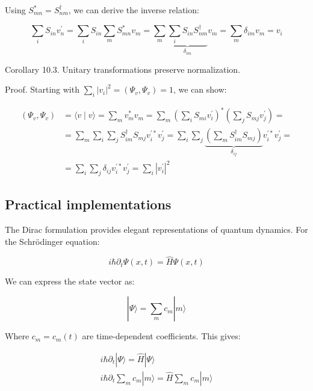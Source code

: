 \documentclass[italian]{HKNdocument}
\begin{document}
Using $S_{m n}^{*}=S_{n m}^{\dagger}$, we can derive the inverse relation:

\begin{equation}
\sum_{i} S_{i n} v_{n}^{\prime}=\sum_{i} S_{i n} \sum_{m} S_{m n}^{*} v_{m}=\sum_{m} \underbrace{\sum_{i} S_{i n} S_{n m}^{\dagger}}_{\delta_{i m}} v_{m}=\sum_{m} \delta_{i m} v_{m}=v_{i} \label{eq:10.18}
\end{equation}

Corollary 10.3. Unitary transformations preserve normalization.

Proof. Starting with $\sum_{i}\left|v_{i}\right|^{2}=\left(\Psi_{v}, \Psi_{v}\right)=1$, we can show:

\begin{align}
\left(\Psi_{v}, \Psi_{v}\right) & =\langle v \mid v\rangle=\sum_{m} v_{m}^{*} v_{m}=\sum_{m}\left(\sum_{i} S_{m i} v_{i}^{\prime}\right)^{*}\left(\sum_{j} S_{m j} v_{j}^{\prime}\right)= \\
& =\sum_{m} \sum_{i} \sum_{j} S_{i m}^{\dagger} S_{m j} v_{i}^{\prime*} v_{j}^{\prime}=\sum_{i} \sum_{j} \underbrace{\left(\sum_{m} S_{i m}^{\dagger} S_{m j}\right)}_{\delta_{i j}} v_{i}^{\prime*} v_{j}^{\prime}=  \label{eq:10.19}\\
& =\sum_{i} \sum_{j} \delta_{i j} v_{i}^{\prime*} v_{j}^{\prime}=\sum_{i}\left|v_{i}^{\prime}\right|^{2}
\end{align}

\subsection{Practical implementations}
The Dirac formulation provides elegant representations of quantum dynamics. For the Schrödinger equation:

\begin{equation}
i \hbar \partial_{t} \Psi(x, t)=\hat{H} \Psi(x, t) \label{eq:10.20}
\end{equation}

We can express the state vector as:

\begin{equation}
|\Psi\rangle=\sum_{m} c_{m}|m\rangle \label{eq:10.21}
\end{equation}

Where $c_{m}=c_{m}(t)$ are time-dependent coefficients. This gives:

\[
\begin{array}{r}
i \hbar \partial_{t}|\Psi\rangle=\hat{H}|\Psi\rangle \\
i \hbar \partial_{t} \sum_{m} c_{m}|m\rangle=\hat{H} \sum_{m} c_{m}|m\rangle \label{eq:10.22}
\end{array}
\]
\end{document}

